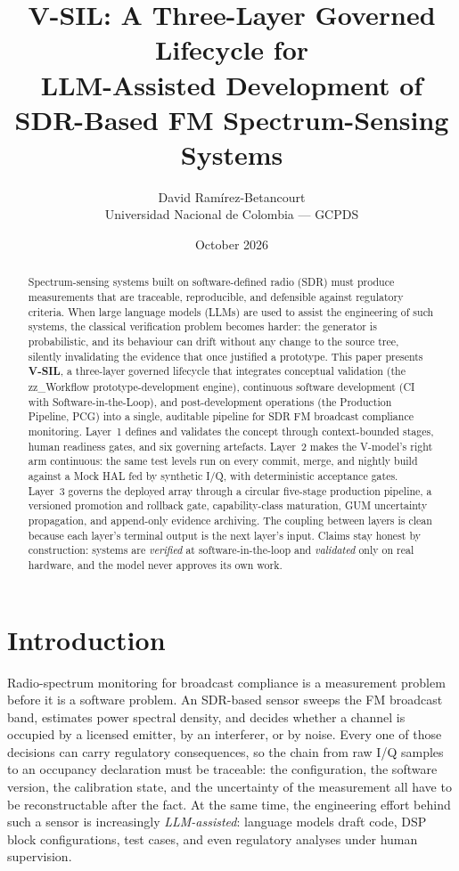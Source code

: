\documentclass[11pt,a4paper]{article}
\title{\textbf{V-SIL}: A Three-Layer Governed Lifecycle for\\[4pt]
LLM-Assisted Development of SDR-Based FM Spectrum-Sensing Systems}
\author{David Ramírez-Betancourt \\
Universidad Nacional de Colombia --- GCPDS}
\date{October 2026}
\begin{document}
\maketitle
\thispagestyle{empty}

\begin{abstract}
\noindent
Spectrum-sensing systems built on software-defined radio (SDR) must produce measurements that are
traceable, reproducible, and defensible against regulatory criteria. When large language models
(LLMs) are used to assist the engineering of such systems, the classical verification problem
becomes harder: the generator is probabilistic, and its behaviour can drift without any change to
the source tree, silently invalidating the evidence that once justified a prototype. This paper
presents \textbf{V-SIL}, a three-layer governed lifecycle that integrates conceptual validation
(the zz\_Workflow prototype-development engine), continuous software development
(CI with Software-in-the-Loop), and post-development operations (the Production Pipeline, PCG)
into a single, auditable pipeline for SDR FM broadcast compliance monitoring. Layer~1 defines and
validates the concept through context-bounded stages, human readiness gates, and six governing
artefacts. Layer~2 makes the V-model's right arm continuous: the same test levels run on every
commit, merge, and nightly build against a Mock HAL fed by synthetic I/Q, with deterministic
acceptance gates. Layer~3 governs the deployed array through a circular five-stage production
pipeline, a versioned promotion and rollback gate, capability-class maturation, GUM uncertainty
propagation, and append-only evidence archiving. The coupling between layers is clean because
each layer's terminal output is the next layer's input. Claims stay honest by construction:
systems are \emph{verified} at software-in-the-loop and \emph{validated} only on real hardware,
and the model never approves its own work.
\end{abstract}

\tableofcontents
\newpage

\section{Introduction}
\label{sec:intro}

Radio-spectrum monitoring for broadcast compliance is a measurement problem before it is a
software problem. An SDR-based sensor sweeps the FM broadcast band, estimates power spectral
density, and decides whether a channel is occupied by a licensed emitter, by an interferer, or by
noise. Every one of those decisions can carry regulatory consequences, so the chain from raw I/Q
samples to an occupancy declaration must be traceable: the configuration, the software version,
the calibration state, and the uncertainty of the measurement all have to be reconstructable
after the fact. At the same time, the engineering effort behind such a sensor is increasingly
\emph{LLM-assisted}: language models draft code, DSP block configurations, test cases, and even
regulatory analyses under human supervision.
\end{document}
